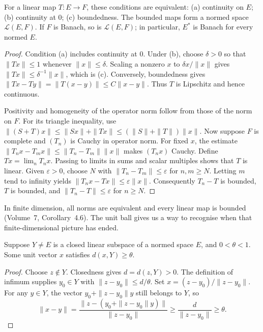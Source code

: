 \begin{proposition}\label{prop:boundedcont}
For a linear map $T:E\to F$, these conditions are equivalent: (a) continuity on $E$; (b) continuity at $0$; (c) boundedness. The bounded maps form a normed space $\mathcal L(E,F)$. If $F$ is Banach, so is $\mathcal L(E,F)$; in particular, $E^*$ is Banach for every normed $E$.
\end{proposition}
\begin{proof}
Condition (a) includes continuity at $0$. Under (b), choose $\delta>0$ so that $\|Tx\|\le1$ whenever $\|x\|\le\delta$. Scaling a nonzero $x$ to $\delta x/\|x\|$ gives $\|Tx\|\le\delta^{-1}\|x\|$, which is (c). Conversely, boundedness gives $\|Tx-Ty\|=\|T(x-y)\|\le C\|x-y\|$. Thus $T$ is Lipschitz and hence continuous.

Positivity and homogeneity of the operator norm follow from those of the norm on $F$. For its triangle inequality, use $\|(S+T)x\|\le\|Sx\|+\|Tx\|\le(\|S\|+\|T\|)\|x\|$. Now suppose $F$ is complete and $(T_n)$ is Cauchy in operator norm. For fixed $x$, the estimate $\|T_nx-T_mx\|\le\|T_n-T_m\|\|x\|$ makes $(T_nx)$ Cauchy. Define $Tx=\lim_nT_nx$. Passing to limits in sums and scalar multiples shows that $T$ is linear. Given $\varepsilon>0$, choose $N$ with $\|T_n-T_m\|\le\varepsilon$ for $n,m\ge N$. Letting $m$ tend to infinity yields $\|T_nx-Tx\|\le\varepsilon\|x\|$. Consequently $T_n-T$ is bounded, $T$ is bounded, and $\|T_n-T\|\le\varepsilon$ for $n\ge N$.
\end{proof}

In finite dimension, all norms are equivalent and every linear map is bounded (Volume~7, Corollary~4.6). The unit ball gives us a way to recognise when that finite-dimensional picture has ended.

\begin{lemma}\label{lem:riesz}
Suppose $Y\ne E$ is a closed linear subspace of a normed space $E$, and $0<\theta<1$. Some unit vector $x$ satisfies $d(x,Y)\ge\theta$.
\end{lemma}
\begin{proof}
Choose $z\notin Y$. Closedness gives $d=d(z,Y)>0$. The definition of infimum supplies $y_0\in Y$ with $\|z-y_0\|\le d/\theta$. Set $x=(z-y_0)/\|z-y_0\|$. For any $y\in Y$, the vector $y_0+\|z-y_0\|y$ still belongs to $Y$, so
\[\|x-y\|=\frac{\|z-(y_0+\|z-y_0\|y)\|}{\|z-y_0\|}\ge\frac d{\|z-y_0\|}\ge\theta.\]
\end{proof}

